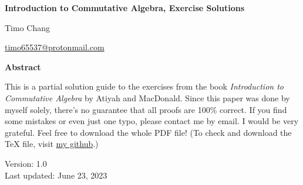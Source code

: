 \documentclass[11pt]{amsbook}
\makeatletter
\theoremstyle{plain}
\theoremstyle{definition}
\theoremstyle{remark}
\newcommand{\myToC}{{
  \renewcommand{\contentsname}{Contents}
  \@starttoc{toc}{\contentsname}
}}
\makeatother
\begin{document}
\begin{titlepage}
\begin{center}
\vspace*{1cm}

\LARGE
\textbf{Introduction to Commutative Algebra, Exercise Solutions}

\vspace{1.5cm}
\LARGE Timo Chang

\vspace{0.5cm}
\large \url{timo65537@protonmail.com}

\vspace{2cm}
\textbf{Abstract}
\vspace{0.3cm}
\end{center}

This is a partial solution guide to the exercises from the book \textit{Introduction to Commutative Algebra} by Atiyah and MacDonald. Since this paper was done by myself solely, there's no guarantee that all proofs are 100\% correct. If you find some mistakes or even just one typo, please contact me by email. I would be very grateful. Feel free to download the whole PDF file! (To check and download the \mbox{\TeX} file, visit \href{https://github.com/bettertimo/introduction-to-commutative-algebra-solutions}{my github}.)

\begin{center}
\vfill

Version: 1.0 \\
Last updated: June 23, 2023
\end{center}

\end{titlepage}

\setcounter{tocdepth}{2}
\myToC



\end{document}
